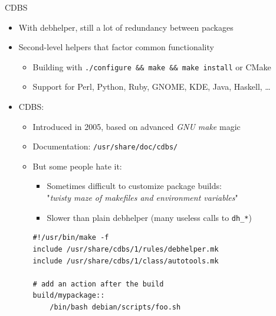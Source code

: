 \documentclass[10pt,final]{beamer}
\begin{document}
\begin{frame}[fragile]{CDBS}
  \hbr
  \begin{itemize}
  \item With debhelper, still a lot of redundancy between packages
    \hbr
  \item Second-level helpers that factor common functionality
    \begin{itemize}
    \item Building with \texttt{./configure \&\& make \&\& make install} or CMake
    \item Support for Perl, Python, Ruby, GNOME, KDE, Java, Haskell, \ldots
    \end{itemize}
    \hbr
  \item CDBS:
    \begin{itemize}
    \item Introduced in 2005, based on advanced \textsl{GNU make} magic
    \item Documentation: \texttt{/usr/share/doc/cdbs/}
    \item But some people hate it:
      \begin{itemize}
      \item Sometimes difficult to customize package builds:\\
        "\textsl{twisty maze of makefiles and environment variables}"
      \item Slower than plain debhelper (many useless calls to \texttt{dh\_*})
      \end{itemize}
      \begin{lstlisting}[basicstyle=\ttfamily\footnotesize]
#!/usr/bin/make -f
include /usr/share/cdbs/1/rules/debhelper.mk
include /usr/share/cdbs/1/class/autotools.mk

# add an action after the build
build/mypackage::
    /bin/bash debian/scripts/foo.sh
      \end{lstlisting}
    \end{itemize}
  \end{itemize}
\end{frame}
\end{document}

